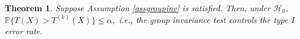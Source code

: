 \documentclass[11pt]{article}
\theoremstyle{plain}
\newtheorem{theorem}{Theorem}[section]
\theoremstyle{definition}
\newcommand{\G}{\mathcal{G}}
\newcommand{\A}{\mathcal{A}}
\newcommand{\Hy}{\mathcal{H}}
\newcommand{\citt}{\citet}
\begin{document}
\begin{theorem} \label{basic}
Suppose Assumption \ref{assgroupinv} is satisfied.
Then, under $\Hy_0$, $\mathbb{P}\big\{T(X)>T^{(k)}(X)\big\}\leq \alpha,$ i.e., the group invariance test controls the type I error rate.
\end{theorem}

\end{document}
